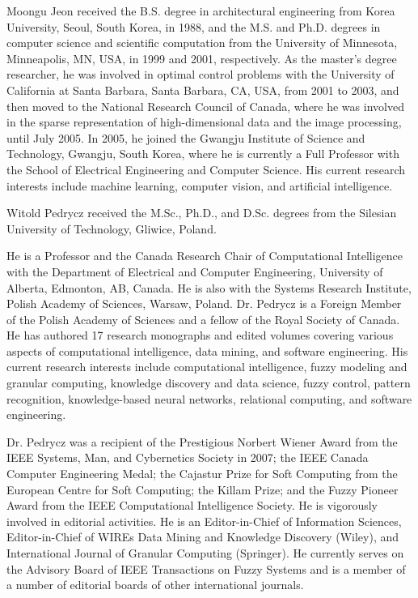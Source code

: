 \documentclass[journal]{IEEEtran}
\begin{document}
    \begin{IEEEbiography}{Moongu Jeon} received the B.S. degree in architectural engineering from Korea University, Seoul, South Korea, in 1988, and the M.S. and Ph.D. degrees in computer science and scientific computation from the University of Minnesota, Minneapolis, MN, USA, in 1999 and 2001, respectively. As the master’s degree researcher, he was involved in optimal control problems with the University of California at Santa Barbara, Santa Barbara, CA, USA, from 2001 to 2003, and then moved to the National Research Council of Canada, where he was involved in the sparse representation of high-dimensional data and the image processing, until July 2005. In 2005, he joined the Gwangju Institute of Science and Technology, Gwangju, South Korea, where he is currently a Full Professor with the School of Electrical Engineering and Computer Science. His current research interests include machine learning, computer vision, and artificial intelligence.
    \end{IEEEbiography}

    \begin{IEEEbiography}{Witold Pedrycz} received the M.Sc., Ph.D., and D.Sc. degrees from the Silesian University of Technology, Gliwice, Poland.
    
    He is a Professor and the Canada Research Chair of Computational Intelligence with the Department of Electrical and Computer Engineering, University of Alberta, Edmonton, AB, Canada. He is also with the Systems Research Institute, Polish Academy of Sciences, Warsaw, Poland. Dr. Pedrycz is a Foreign Member of the Polish Academy of Sciences and a fellow of the Royal Society of Canada. He has authored 17 research monographs and edited volumes covering various aspects of computational intelligence, data mining, and software engineering. His current research interests include computational intelligence, fuzzy modeling and granular computing, knowledge discovery and data science, fuzzy control, pattern recognition, knowledge-based neural networks, relational computing, and software engineering.
    
    Dr. Pedrycz was a recipient of the Prestigious Norbert Wiener Award from the IEEE Systems, Man, and Cybernetics Society in 2007; the IEEE Canada Computer Engineering Medal; the Cajastur Prize for Soft Computing from the European Centre for Soft Computing; the Killam Prize; and the Fuzzy Pioneer Award from the IEEE Computational Intelligence Society. He is vigorously involved in editorial activities. He is an Editor-in-Chief of Information Sciences, Editor-in-Chief of WIREs Data Mining and Knowledge Discovery (Wiley), and International Journal of Granular Computing (Springer). He currently serves on the Advisory Board of IEEE Transactions on Fuzzy Systems and is a member of a number of editorial boards of other international journals.
    \end{IEEEbiography}
\end{document}
